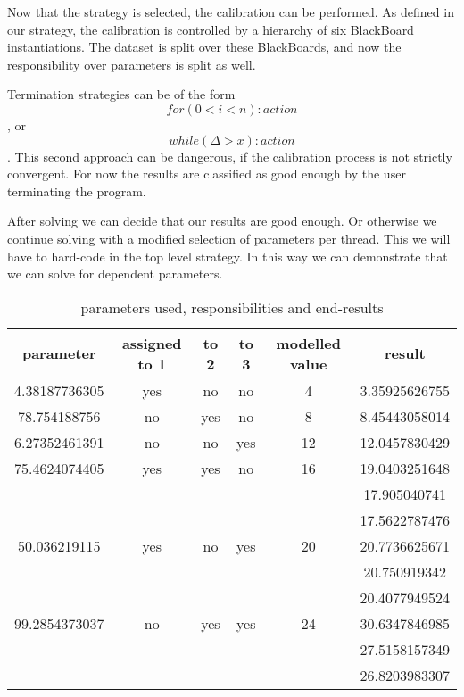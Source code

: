 \documentclass[]{lofar}
\begin{document}
      Now that the strategy is selected, the calibration can be
      performed.  As defined in our strategy, the calibration is
      controlled by a hierarchy of six BlackBoard instantiations. The
      dataset is split over these BlackBoards, and now the
      responsibility over parameters is split as well.

      Termination strategies can be of the form \[for ( 0 < i < n ) :
      action\], or \[while (\Delta > x): action\]. This second
      approach can be dangerous, if the calibration process is not
      strictly convergent. For now the results are classified as good
      enough by the user terminating the program.

      After solving we can decide that our results are good enough. Or
      otherwise we continue solving with a modified selection of
      parameters per thread. This we will have to hard-code in the top
      level strategy. In this way we can demonstrate that we can solve
      for dependent parameters.

      \begin{table}[hbt]
        \begin{center}%
          \hypertarget{parametertable}{}%
          \caption{parameters used, responsibilities and end-results}
          \begin{tabular}{|c|c|c|c|c|c|}
            \hline 
            parameter & assigned to 1 & to 2 & to 3 & modelled value & result\tabularnewline
            \hline 
            4.38187736305 & yes & no & no & 4 & 3.35925626755 \tabularnewline
            \hline 
            78.754188756 & no & yes & no & 8 & 8.45443058014 \tabularnewline
            \hline 
            6.27352461391 & no & no & yes & 12 & 12.0457830429 \tabularnewline
            \hline 
            75.4624074405 & yes & yes & no & 16 & 19.0403251648 \tabularnewline
            \hline 
            & & & & & 17.905040741 \tabularnewline
            \hline 
            & & & & & 17.5622787476 \tabularnewline
            \hline 
            50.036219115 & yes & no & yes & 20 & 20.7736625671 \tabularnewline
            \hline
            & & & & & 20.750919342 \tabularnewline
            \hline
            & & & & & 20.4077949524 \tabularnewline
            \hline
            99.2854373037 & no & yes & yes & 24 & 30.6347846985 \tabularnewline
            \hline 
            & & & & & 27.5158157349 \tabularnewline
            \hline
            & & & & & 26.8203983307 \tabularnewline
            \hline
          \end{tabular}
          \label{parametertable}
        \end{center}
      \end{table}
\end{document}
